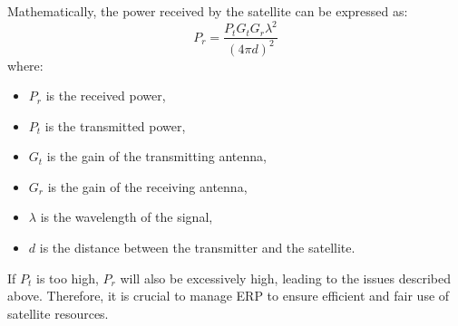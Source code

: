 Mathematically, the power received by the satellite can be expressed as:
\[
P_r = \frac{P_t G_t G_r \lambda^2}{(4 \pi d)^2}
\]
where:
\begin{itemize}
    \item \( P_r \) is the received power,
    \item \( P_t \) is the transmitted power,
    \item \( G_t \) is the gain of the transmitting antenna,
    \item \( G_r \) is the gain of the receiving antenna,
    \item \( \lambda \) is the wavelength of the signal,
    \item \( d \) is the distance between the transmitter and the satellite.
\end{itemize}

If \( P_t \) is too high, \( P_r \) will also be excessively high, leading to the issues described above. Therefore, it is crucial to manage ERP to ensure efficient and fair use of satellite resources.

